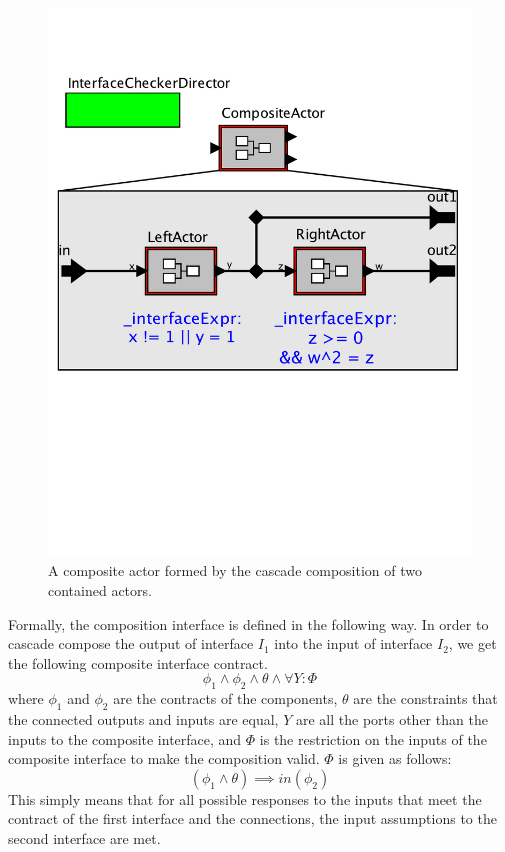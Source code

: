 \documentclass[preprint,11pt]{sigplanconf}
\begin{document}
\begin{figure}[htbp]
\centering
\includegraphics[width=\columnwidth]{figs/cascadeComp} 
\caption{A composite actor formed by the cascade composition of two contained
actors.}
\label{fig:cascadeComp}
\end{figure}

Formally, the composition interface is defined in the following way. In order
to cascade compose the output of interface $I_1$ into the input of interface
$I_2$, we get the following composite interface contract.
\[
\phi_1 \wedge \phi_2 \wedge \theta \wedge \forall Y: \Phi
\]
where $\phi_1$ and $\phi_2$ are the contracts of the components, $\theta$ are
the constraints that the connected outputs and inputs are equal, $Y$ are all
the ports other than the inputs to the composite interface, and $\Phi$ is the
restriction on the inputs of the composite interface to make the composition valid.
$\Phi$ is given as follows:
\[
(\phi_1 \wedge \theta) \implies in(\phi_2)
\]
This simply means that for all possible responses to the inputs that meet the
contract of the first interface and the connections, the input assumptions to
the second interface are met.
\end{document}
